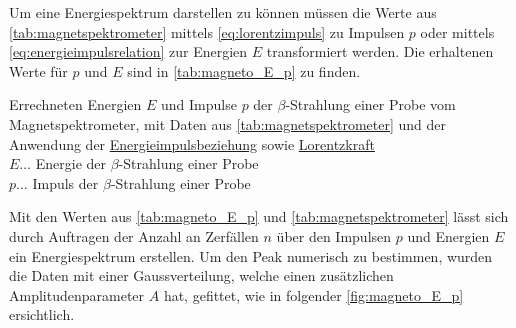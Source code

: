 \documentclass[12pt,english,ngerman]{scrartcl}
\begin{document}
Um eine Energiespektrum darstellen zu können müssen die Werte aus
\autoref{tab:magnetspektrometer} mittels \autoref{eq:lorentzimpuls} zu Impulsen
$p$ oder mittels \autoref{eq:energieimpulsrelation} zur Energien $E$
transformiert werden. Die erhaltenen Werte für $p$ und $E$ sind in
\autoref{tab:magneto_E_p} zu finden.

\begin{table}[H]
	\caption[Energie- und Impulswerte der $\beta$-Strahlung einer  Probe]{
		Errechneten Energien $E$ und Impulse $p$ der $\beta$-Strahlung einer
		 Probe vom Magnetspektrometer, mit Daten aus
		\autoref{tab:magnetspektrometer} und der Anwendung der
		\hyperref[eq:energieimpulsrelation]{Energieimpulsbeziehung} sowie
		\hyperref[eq:lorentzimpuls]{Lorentzkraft}                                                           \\
		$E \dots$ Energie der $\beta$-Strahlung einer  Probe \\
		$p \dots$ Impuls der $\beta$-Strahlung einer  Probe  \\
	}\label{tab:magneto_E_p}
	\centering
	
\end{table}

Mit den Werten aus \autoref{tab:magneto_E_p} und
\autoref{tab:magnetspektrometer} lässt sich durch Auftragen der Anzahl an
Zerfällen $n$ über den Impulsen $p$ und Energien $E$ ein Energiespektrum
erstellen. Um den Peak numerisch zu bestimmen, wurden die Daten mit einer
Gaussverteilung, welche einen zusätzlichen Amplitudenparameter $A$ hat,
gefittet, wie in folgender \autoref{fig:magneto_E_p} ersichtlich.
\end{document}
